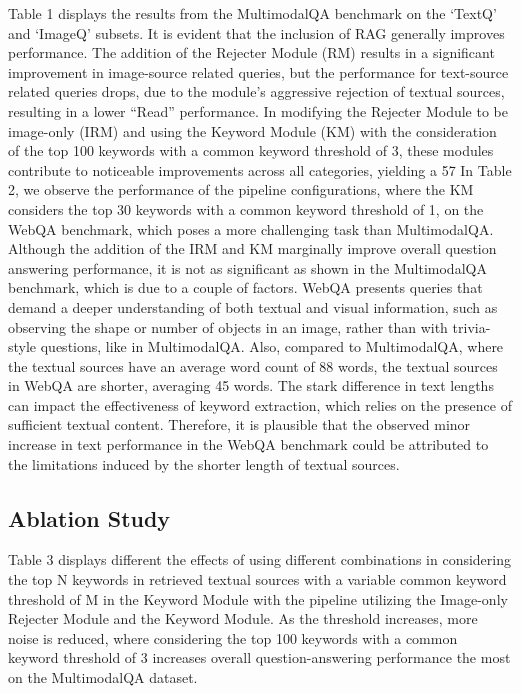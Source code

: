 \documentclass[twocolumn]{article}
\begin{document}
Table 1 displays the results from the MultimodalQA benchmark on the ‘TextQ’ and ‘ImageQ’ subsets. It is evident that the inclusion of RAG generally improves performance. The addition of the Rejecter Module (RM) results in a significant improvement in image-source related queries, but the performance for text-source related queries drops, due to the module’s aggressive rejection of textual sources, resulting in a lower “Read” performance. In modifying the Rejecter Module to be image-only (IRM) and using the Keyword Module (KM) with the consideration of the top 100 keywords with a common keyword threshold of 3, these modules contribute to noticeable improvements across all categories, yielding a 57%
In Table 2, we observe the performance of the pipeline configurations, where the KM considers the top 30 keywords with a common keyword threshold of 1, on the WebQA benchmark, which poses a more challenging task than MultimodalQA. Although the addition of the IRM and KM marginally improve overall question answering performance, it is not as significant as shown in the MultimodalQA benchmark, which is due to a couple of factors. WebQA presents queries that demand a deeper understanding of both textual and visual information, such as observing the shape or number of objects in an image, rather than with trivia-style questions, like in MultimodalQA. Also, compared to MultimodalQA, where the textual sources have an average word count of 88 words, the textual sources in WebQA are shorter, averaging 45 words. The stark difference in text lengths can impact the effectiveness of keyword extraction, which relies on the presence of sufficient textual content. Therefore, it is plausible that the observed minor increase in text performance in the WebQA benchmark could be attributed to the limitations induced by the shorter length of textual sources. 

\subsection{Ablation Study}
Table 3 displays different the effects of using different combinations in considering the top N keywords in retrieved textual sources with a variable common keyword threshold of M in the Keyword Module with the pipeline utilizing the Image-only Rejecter Module and the Keyword Module. As the threshold increases, more noise is reduced, where considering the top 100 keywords with a common keyword threshold of 3 increases overall question-answering performance the most on the MultimodalQA dataset.
\end{document}
